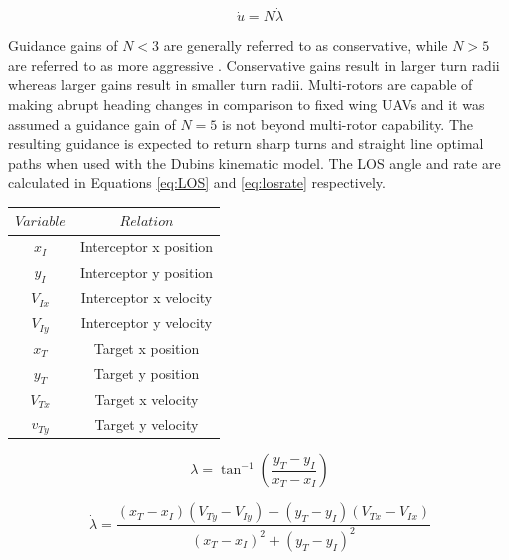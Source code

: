 \documentclass[conference]{IEEEtran}
\begin{document}
\begin{equation} \label{eq:PNlaw}
\dot{u} = N\dot{\lambda}
\end{equation}


Guidance gains of $N < 3$ are generally referred to as conservative, while $N > 5$ are referred to as more aggressive \cite{zarchan}. Conservative gains result in larger turn radii whereas larger gains result in smaller turn radii. Multi-rotors are capable of making abrupt heading changes in comparison to fixed wing UAVs and it was assumed a guidance gain of $N = 5$ is not beyond multi-rotor capability. The resulting guidance is expected to return sharp turns and straight line optimal paths when used with the Dubins kinematic model. The LOS angle and rate are calculated in Equations \ref{eq:LOS} and \ref{eq:losrate} respectively. 
 
 \begin{table}
 \centering
 \begin{tabular}{cc}
 	
 	$Variable$ & $Relation$ \\
 	\hline 
 	$x_I$  & Interceptor x position \\ 
 	
 	$y_I$ & Interceptor y position \\ 
 	
 	$V_{Ix}$ & Interceptor x velocity \\ 
 	
 	$V_{Iy}$ & Interceptor y velocity \\ 
 	
 	$x_T$ & Target x position \\ 
 	
 	$y_T$ & Target y position \\ 
 	
 	$V_{Tx}$ & Target x velocity \\ 
 	
 	$v_{Ty}$ & Target y velocity \\ 
 	
 \end{tabular}
 \end{table}







\begin{equation} \label{eq:LOS}
\lambda = \tan^{-1} \left(\frac{y_T - y_I}{x_T - x_I}\right)
\end{equation} 

\begin{equation} \label{eq:losrate}
\dot{\lambda} = \frac{(x_T - x_I)(V_{Ty}-V_{Iy}) - (y_T - y_I)(V_{Tx}-V_{Ix})}{(x_T - x_I)^2+(y_T - y_I)^2}
\end{equation}
\end{document}
